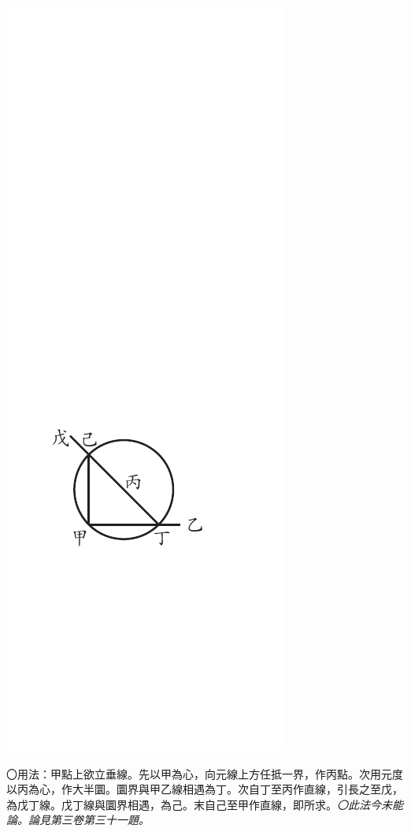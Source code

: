\documentclass[12pt,b5paper,landscape]{article}
\newcommand{\ccom}[1]{{\footnotesize \emph{〇#1}}}
\newcommand{\bcom}[1]{〇#1}
\begin{document}
\begin{multicols}{2}
\begin{center}
\includegraphics[angle=90]{eu54}
\end{center}
\bcom{用法：甲點上欲立垂線。先以甲為心，向元線上方任抵一界，作丙點。次用元度以丙為心，作大半圜。圜界與甲乙線相遇為丁。次自丁至丙作直線，引長之至戊，為戊丁線。戊丁線與圜界相遇，為己。末自己至甲作直線，即所求。\ccom{此法今未能論。論見第三卷第三十一題。}}


\end{multicols}
\end{document}
